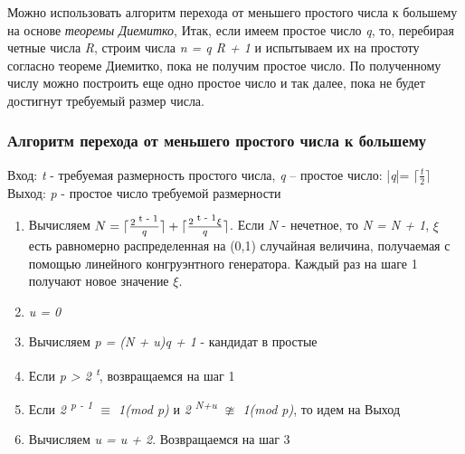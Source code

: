 \begin{comment}
  Если число \textit{N} выдержало все тесты на простоту, то появляется надежда на то, что \textit{N} - простое число, и следует попытаться 
  доказать простоту с помощью \textit{теоремы Диемитко}. Для этого можно случайным образом выбирать число \textit{a, 1 < a < N},
  и проверять для него выполнимость соотношений

  \begin{equation}
    \textit{a\textsuperscript{ N - 1} {$\equiv$} (mod N), (a\textsuperscript{ R} - 1, N) = 1}.
  \end{equation}
  
  Если при выбранном \textit{a} эти соотношения выполняются, то, согласно следствию из \textit{теоремы Диемитко}, можно 
  утверждать, что число \textit{N} простое. Если же эти условия нарушаются, нужно выбрать другое значение \textit{a} и повторять 
  эти операции до тех пор, пока такое число не будет обнаружено.
  \end{comment}
  Можно использовать алгоритм перехода от меньшего простого числа к большему на основе \textit{теоремы Диемитко},
  Итак, если имеем простое число \textit{q}, то, перебирая четные числа \textit{R}, строим числа \textit{n = q R + 1} и испытываем их на 
  простоту согласно теореме Диемитко, пока не получим простое число. По полученному числу можно построить еще одно простое число и так далее,
  пока не будет достигнут требуемый размер числа. 

  
  \subsubsection{Алгоритм перехода от меньшего простого числа к большему}
    Вход: \textit{t} - требуемая размерность простого числа, \textit{q} – простое число: |\textit{q}|= \textit{{$\lceil \frac{t}{2} \rceil$}}
    Выход: \textit{p} - простое число требуемой размерности
    
      \begin{enumerate}
      \item Вычисляем \textit{{$N = \lceil \frac{2\textsuperscript{ t - 1}}{q} \rceil + \lceil \frac{2\textsuperscript{ t - 1} \xi}{q} \rceil$}}. 
      Если \textit{N} - нечетное, то \textit{N = N + 1}, \textit{{$\xi$}} есть равномерно распределенная на (0,1) случайная величина, получаемая с помощью 
      линейного конгруэнтного генератора. Каждый раз на шаге 1 получают новое значение \textit{{$\xi$}}.
      \item \textit{u = 0}
      \item Вычисляем \textit{p = (N + u)q + 1} - кандидат в простые
      \item Если \textit{p > 2\textsuperscript{ t}}, возвращаемся на шаг 1
      \item Если \textit{2\textsuperscript{ p - 1} {$\equiv$} 1(mod p)} и \textit{2\textsuperscript{ N+u} {$\ncong$} 1(mod p)}, то идем на Выход
      \item Вычисляем \textit{u = u + 2}. Возвращаемся на шаг 3
      \end{enumerate}
      
